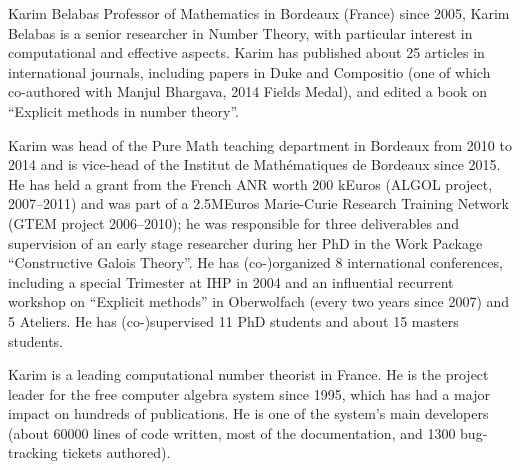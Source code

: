 \begin{participant}[type=PI,PM=12,salary=7500,gender=male]{Karim Belabas}
  Professor of Mathematics in Bordeaux (France) since 2005, Karim Belabas is
a senior researcher in Number Theory, with particular interest in
computational and effective aspects. Karim has published about 25 articles
in international journals, including papers in Duke and Compositio (one of
which co-authored with Manjul Bhargava, 2014 Fields Medal), and
edited a book on ``Explicit methods in number theory''.

Karim was head of the Pure Math teaching department in Bordeaux from 2010 to
2014 and is vice-head of the Institut de Math\'ematiques de Bordeaux since
2015. He has held a grant from the French ANR worth $200$ kEuros (ALGOL
project, 2007--2011) and was part of a 2.5MEuros Marie-Curie Research
Training Network (GTEM project 2006--2010); he was responsible for three
deliverables and supervision of an early stage researcher during her PhD in
the Work Package ``Constructive Galois Theory''. He has (co-)organized 8
international conferences, including a special Trimester at IHP in 2004 and
an influential recurrent workshop on ``Explicit methods'' in Oberwolfach
(every two years since 2007) and 5 \PariGP Ateliers. He has (co-)supervised
11 PhD students and about 15 masters students.

Karim is a leading computational number theorist in France. He
is the project leader for the \PariGP free computer algebra system since
1995, which has had a major impact on hundreds of publications. He is one of
the system's main developers (about 60000 lines of code written, most of the
documentation, and 1300 bug-tracking tickets authored).
\end{participant}
